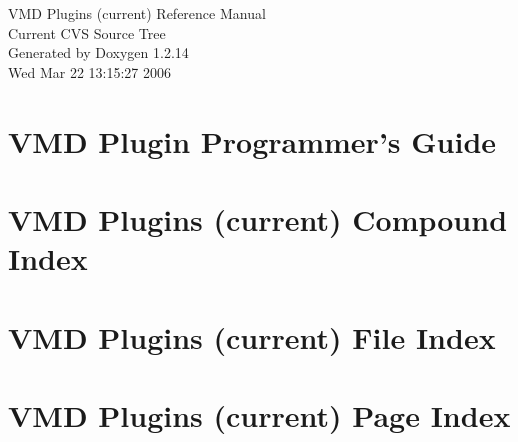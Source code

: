 \documentclass[a4paper]{book}
\begin{document}
\begin{titlepage}
\vspace*{7cm}
\begin{center}
{\Large VMD Plugins (current) Reference Manual\\[1ex]\large Current CVS Source Tree}\\
\vspace*{1cm}
{\large Generated by Doxygen 1.2.14}\\
\vspace*{0.5cm}
{\small Wed Mar 22 13:15:27 2006}\\
\end{center}
\end{titlepage}
\clearemptydoublepage
{}
\tableofcontents
\clearemptydoublepage
{}
\chapter{VMD Plugin Programmer's Guide}
\label{index}
\chapter{VMD Plugins (current) Compound Index}

\chapter{VMD Plugins (current) File Index}

\chapter{VMD Plugins (current) Page Index}

\end{document}
